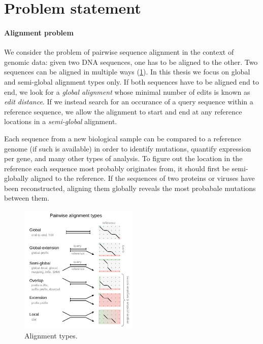 \section*{Problem statement}

\paragraph{Alignment problem}
We consider the problem of pairwise sequence alignment in the context of genomic
data: given two DNA sequences, one has to be aligned to the other. Two sequences
can be aligned in multiple ways (\cref{fig:alignment-types}). In this thesis we
focus on global and semi-global alignment types only. If both sequences have to
be aligned end to end, we look for a \emph{global alignment} whose minimal
number of edits is known as \emph{edit distance}. If we instead search for an
occurance of a query sequence within a reference sequence, we allow the
alignment to start and end at any reference locations in a \emph{semi-global}
alignment.

Each sequence from a new biological sample can be compared to a reference genome
(if such is available) in order to identify mutations, quantify expression per
gene, and many other types of analysis. To figure out the location in the
reference each sequence most probably originates from, it should first be
semi-globally aligned to the reference. If the sequences of two proteins or
viruses have been reconstructed, aligning them globally reveals the most
probabale mutations between them.

\begin{figure}[t]  %
    \includegraphics[width=0.5\textwidth]{alignment-types}
	\caption[Alignment types]{Alignment types.}
    \label{fig:alignment-types}
\end{figure}


